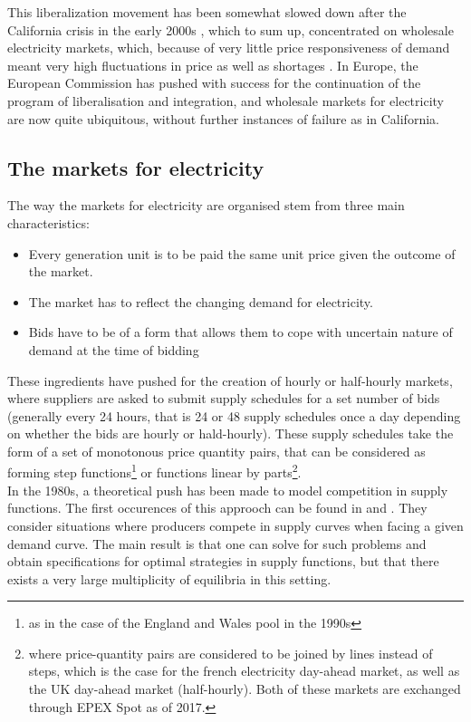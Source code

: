 This liberalization movement has been somewhat slowed down after the California crisis in the early 2000s \cite{jamasb2005electricity}, which to sum up, concentrated on wholesale electricity markets, which, because of very little price responsiveness of demand meant very high fluctuations in price as well as shortages \cite{borenstein2002trouble}. In Europe, the European Commission has pushed with success for the continuation of the program of liberalisation and integration, and wholesale markets for electricity are now quite ubiquitous, without further instances of failure as in California. 

\subsection{The markets for electricity}
The way the markets for electricity are organised stem from three main characteristics:
\begin{itemize}
\item Every generation unit is to be paid the same unit price given the outcome of the market.
\item The market has to reflect the changing demand for electricity.
\item Bids have to be of a form that allows them to cope with uncertain nature of demand at the time of bidding
\end{itemize}

These ingredients have pushed for the creation of hourly or half-hourly markets, where suppliers are asked to submit supply schedules for a set number of bids (generally every 24 hours, that is 24 or 48 supply schedules once a day depending on whether the bids are hourly or hald-hourly). These supply schedules take the form of a set of monotonous price quantity pairs, that can be considered as forming step functions\footnote{as in the case of the England and Wales pool in the 1990s} or functions linear by parts\footnote{where price-quantity pairs are considered to be joined by lines instead of steps, which is the case for the french electricity day-ahead market, as well as the UK day-ahead market (half-hourly). Both of these markets are exchanged through EPEX Spot as of 2017.}.\\

In the 1980s, a theoretical push has been made to model competition in supply functions. The first occurences of this approoch can be found in \cite{grossman1981nash} and \cite{hart1982imperfect}. They consider situations where producers compete in supply curves when facing a given demand curve. The main result is that one can solve for such problems and obtain specifications for optimal strategies in supply functions, but that there exists a very large multiplicity of equilibria in this setting.\\

